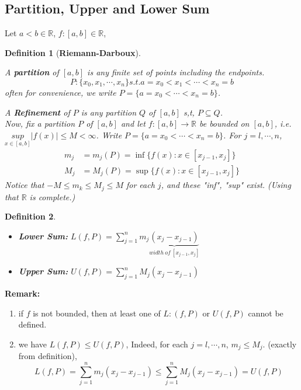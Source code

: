 \documentclass[12pt]{article}
\theoremstyle{plain}
\newtheorem{definition}{Definition}[subsection]
\newcommand{\abs}[1]{\left| #1 \right|}
\begin{document}
	\vspace{0.3 in}



	\subsection{Partition, Upper and Lower Sum}
	Let $a<b \in \mathbb{R}$, $f:[a,b]\in\mathbb{R}$,

	\begin{definition}[\textbf{Riemann-Darboux}]
		$ $
		
		A \textbf{partition} of $[a,b]$ is any finite set of points including
		the endpoints. 
		\[
			P:\{x_0,x_1,\cdots, x_n\} s.t. a=x_0<x_1<\cdots<x_n=b
		\]
		often for convenience, we write $P=\{a=x_0<\cdots<x_n=b\}$.
	
		A \textbf{Refinement} of $P$ is any partition $Q$ of $[a,b]$ s,t,
		$P\subseteq Q$.\\
	
		Now, fix a partition $P$ of $[a,b]$ and let $f:[a,b]\to \mathbb{R}$ be 
		bounded on $[a,b]$, i.e. $\underset{x\in [a,b]}{sup} 
		\abs{f(x)}\leq M<\infty$.	
		Write $P=\{a=x_0<\cdots<x_n=b\}$. For $j = l, \cdots, n$, 
		\begin{align*}
			m_j &= m_j(P) = \inf \{f(x) : x\in [x_{j-1},x_j]\}\\
			M_j &= M_j(P) = \sup \{f(x) : x\in [x_{j-1},x_j]\}
		\end{align*}
	Notice that $-M\leq m_k\leq M_j\leq M$ for each $j$, and these "inf", "sup"
	exist. (Using that $\mathbb{R}$ is complete.)\\
	\end{definition}

	\begin{definition}
		$ $
		\begin{itemize}
			\item \textbf{Lower Sum:}
				$L(f, P) = \sum_{j=1}^n m_j 
				\underbrace{(x_j-x_{j-1})}_{width\ of\ [x_{j-1},x_j]}$
			\item \textbf{Upper Sum:} 
				$U(f, P) = \sum_{j=1}^n M_j (x_j-x_{j-1})$\\
		\end{itemize}
	\end{definition}

	{\color{brown}
	\textbf{Remark: }
	\begin{enumerate}
		\item if $f$ is not bounded, then at least one of $L:(f,P)$ or $U(f, P)$ 
			cannot be defined. 
			
		\item we have $L(f, P)\leq U(f,P)$, Indeed, for each $j=l,\cdots, n$,
			$m_j\leq M_j$. (exactly from definition), 
			\[
				L(f, P) = \sum_{j=1}^n m_j (x_j-x_{j-1})\leq
				\sum_{j=1}^n M_j (x_j-x_{j-1}) = U(f, P)
			\]
	\end{enumerate}}
\end{document}

